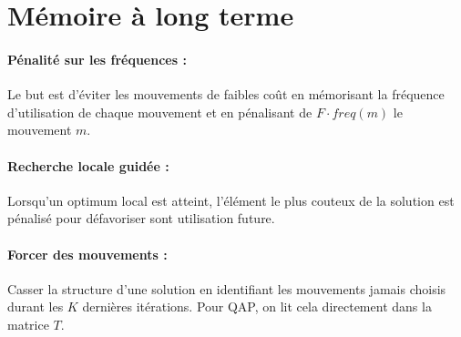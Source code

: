 \documentclass[11pt,a4paper]{report}
\begin{document}
\section{Mémoire à long terme}
\paragraph*{Pénalité sur les fréquences : }Le but est d'éviter les mouvements de faibles coût en mémo\-risant la fréquence d'utilisation de chaque mouvement et en pénalisant de $F\cdot freq(m)$ le mouvement $m$.
\paragraph*{Recherche locale guidée : } Lorsqu'un optimum local est atteint, l'élément le plus couteux de la solution est pénalisé pour défavoriser sont utilisation future.
\paragraph*{Forcer des mouvements : } Casser la structure d'une solution en identifiant les mouvements jamais choisis durant les $K$ dernières itérations. Pour QAP, on lit cela directement dans la matrice $T$.
\end{document}
